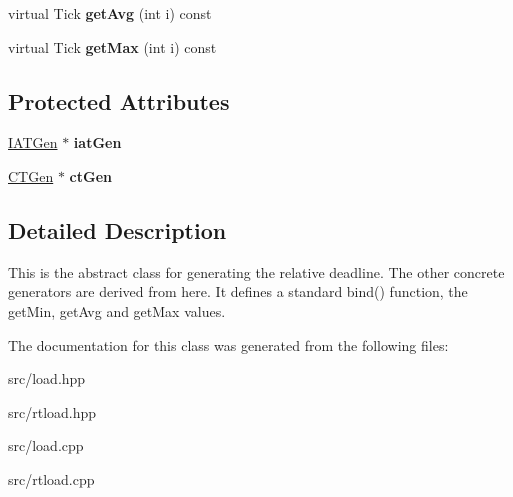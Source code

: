 \begin{DoxyCompactItemize}
\item 
virtual Tick {\bfseries get\+Avg} (int i) const \hypertarget{classRTSim_1_1DTGen_a3787597662f2f10f728094f3cf01d985}{}\label{classRTSim_1_1DTGen_a3787597662f2f10f728094f3cf01d985}

\item 
virtual Tick {\bfseries get\+Max} (int i) const \hypertarget{classRTSim_1_1DTGen_a420c1953f7b056a0069b62e19a603272}{}\label{classRTSim_1_1DTGen_a420c1953f7b056a0069b62e19a603272}

\end{DoxyCompactItemize}
\subsection*{Protected Attributes}
\begin{DoxyCompactItemize}
\item 
\hyperlink{classRTSim_1_1IATGen}{I\+A\+T\+Gen} $\ast$ {\bfseries iat\+Gen}\hypertarget{classRTSim_1_1DTGen_a26b42f17279cdb07a28b3fc481d410de}{}\label{classRTSim_1_1DTGen_a26b42f17279cdb07a28b3fc481d410de}

\item 
\hyperlink{classRTSim_1_1CTGen}{C\+T\+Gen} $\ast$ {\bfseries ct\+Gen}\hypertarget{classRTSim_1_1DTGen_a61c0c57f3eb9ff7c5d642ad393a22c16}{}\label{classRTSim_1_1DTGen_a61c0c57f3eb9ff7c5d642ad393a22c16}

\end{DoxyCompactItemize}


\subsection{Detailed Description}
This is the abstract class for generating the relative deadline. The other concrete generators are derived from here. It defines a standard bind() function, the get\+Min, get\+Avg and get\+Max values. 

The documentation for this class was generated from the following files\+:\begin{DoxyCompactItemize}
\item 
src/load.\+hpp\item 
src/rtload.\+hpp\item 
src/load.\+cpp\item 
src/rtload.\+cpp\end{DoxyCompactItemize}
